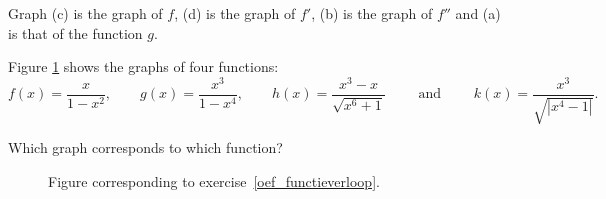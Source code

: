 \begin{Answer}\phantom{}
    Graph (c) is the graph of $f$, (d) is the graph of $f'$, (b) is the graph of $f''$ and (a) is that of the function $g$.
\end{Answer}

\ifanalysis\begin{Exercise}[difficulty = 1, label = oef_functieverloop]\fi \ifcalculus\begin{Exercise}[difficulty = 2, label = oef_functieverloop]\fi 
Figure \ref{fig_behaviour_32} shows the graphs of four functions:
\[ f(x) = \dfrac{x}{1-x^2}, \qquad g(x) = \dfrac{x^3}{1-x^4}, \qquad h(x) = \dfrac{x^3 - x}{\sqrt{x^6+1}} \qquad \text{ and } \qquad k(x) = \dfrac{x^3}{\sqrt{|x^4-1|}}.\]

Which graph corresponds to which function?
\begin{figure}[H]
\centerline{
\hspace{0.1cm}
}
\centerline{
\hspace{0.1cm}
}
\caption{Figure corresponding to exercise~\ref{oef_functieverloop}.}
\label{fig_behaviour_32}


\end{figure}
\end{Exercise}
\end{Exercise}
